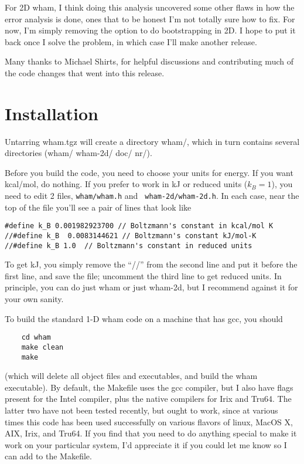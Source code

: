 \documentclass[12pt]{article}
\begin{document}
For 2D wham, I think doing this analysis uncovered some other flaws in how the
error analysis is done, ones that to be honest I'm not totally sure how to
fix.  For now, I'm simply removing the option to do bootstrapping in 2D.  I
hope to put it back once I solve the problem, in which case I'll make another
release.

Many thanks to Michael Shirts, for helpful discussions and contributing much
of the code changes that went into this release.

\section{Installation}

Untarring wham.tgz will create a directory wham/, which in turn contains
several directories (wham/ wham-2d/ doc/ nr/).

Before you build the code, you need to choose your units for energy.  If you
want kcal/mol, do nothing.  If you prefer to work in kJ or reduced units
($k_B=1$), you need to edit 2 files, {\tt wham/wham.h} and {\tt
wham-2d/wham-2d.h}.  In each case, near the top of the file you'll see a pair of
lines that look like

\begin{verbatim}
#define k_B 0.001982923700 // Boltzmann's constant in kcal/mol K
//#define k_B  0.0083144621 // Boltzmann's constant kJ/mol-K
//#define k_B 1.0  // Boltzmann's constant in reduced units
\end{verbatim}

To get kJ, you simply remove the ``//'' from the second line and put it before
the first line, and save the file; uncomment the third line to get reduced
units.  In principle, you can do just wham or just wham-2d, but I recommend
against it for your own sanity.

To build the standard 1-D wham code on a machine that has gcc, you should

\begin{verbatim}
    cd wham
    make clean
    make
\end{verbatim}

(which will delete all object files and executables, and build the wham
executable).  By default, the Makefile uses the gcc compiler, but I also have
flags present for the Intel compiler, plus the native compilers for Irix and
Tru64.  The latter two have not been tested recently, but ought to work,
since at various times this code has been used successfully on various
flavors of linux, MacOS X, AIX, Irix, and Tru64.  If you find that you need
to do anything special to make it work on your particular system, I'd
appreciate it if you could let me know so I can add to the Makefile.
\end{document}

